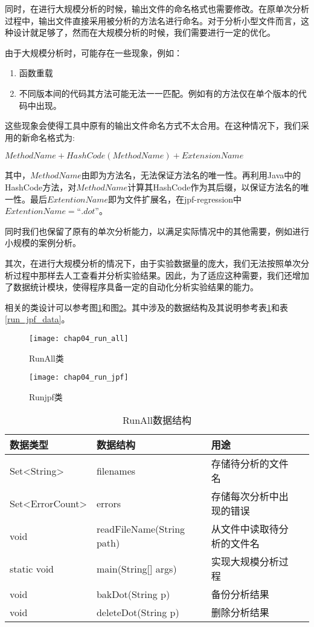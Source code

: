 同时，在进行大规模分析的时候，输出文件的命名格式也需要修改。在原单次分析过程中，输出文件直接采用被分析的方法名进行命名。对于分析小型文件而言，这种设计就足够了，然而在大规模分析的时候，我们需要进行一定的优化。

由于大规模分析时，可能存在一些现象，例如：
\begin{enumerate}
	\item 函数重载
	\item 不同版本间的代码其方法可能无法一一匹配。例如有的方法仅在单个版本的代码中出现。
\end{enumerate}

这些现象会使得工具中原有的输出文件命名方式不太合用。在这种情况下，我们采用的新命名格式为:

$MethodName+HashCode(MethodName)+ExtensionName$

其中，$MethodName$由即为方法名，无法保证方法名的唯一性。再利用Java中的HashCode方法，对$MethodName$计算其HashCode作为其后缀，以保证方法名的唯一性。最后$ExtentionName$即为文件扩展名，在jpf-regression中$ExtentionName = “.dot”$。

同时我们也保留了原有的单次分析能力，以满足实际情况中的其他需要，例如进行小规模的案例分析。

其次，在进行大规模分析的情况下，由于实验数据量的庞大，我们无法按照单次分析过程中那样去人工查看并分析实验结果。因此，为了适应这种需要，我们还增加了数据统计模块，使得程序具备一定的自动化分析实验结果的能力。

相关的类设计可以参考图\ref {class_run_all}和图\ref {class_run_jpf}。其中涉及的数据结构及其说明参考表\ref {run_all_data}和表\ref {run_jpf_data}。

\begin{figure}[H]
	\centering
	\texttt{[image: chap04\_run\_all]}
	\caption {RunAll类}
	\label {class_run_all}	
\end{figure}

\begin{figure}[H]
	\centering
	\texttt{[image: chap04\_run\_jpf]}
	\caption {Runjpf类}
	\label {class_run_jpf}	
\end{figure}

\begin{table}
	\caption{RunAll数据结构}
	\label{run_all_data}
	\centering
	\begin{tabular}{lllc}
		\toprule[1.5pt]
		{\heiti 数据类型} &{\heiti 数据结构} & {\heiti 用途} \\\midrule[1pt]
		Set<String> & filenames & 存储待分析的文件名 \\
		Set<ErrorCount> & errors & 存储每次分析中出现的错误 \\
		void & readFileName(String path) & 从文件中读取待分析的文件名\\
		static void & main(String[] args) & 实现大规模分析过程\\
		void & bakDot(String p) & 备份分析结果\\
		void & deleteDot(String p) & 删除分析结果\\
		\bottomrule[1.5pt]
	\end{tabular}
\end{table}

